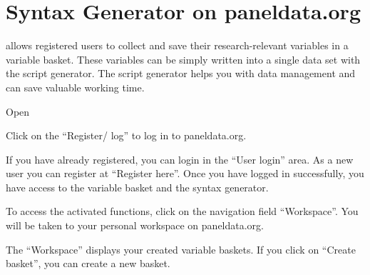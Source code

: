 \documentclass[letterpaper,10pt,openany,onesideH,english]{sphinxmanual}
\begin{document}
\section{Syntax Generator on paneldata.org}
\label{\detokenize{Working with SOEP Documentation/index:syntax-generator-on-paneldata-org}}\label{\detokenize{Working with SOEP Documentation/index:syntax}}
 allows registered users to collect and save their research-relevant variables in a variable basket. These variables can be simply written into a single data set with the script generator. The script generator helps you with data management and can save valuable working time.

Open 

\begin{figure}[H]
\centering

\noindent{}
\end{figure}

Click on the “Register/ log” to log in to paneldata.org.

\begin{figure}[H]
\centering

\noindent{}
\end{figure}

If you have already registered, you can login in the “User login” area. As a new user you can register at “Register here”. Once you have logged in successfully, you have access to the variable basket and the syntax generator.

\begin{figure}[H]
\centering

\noindent{}
\end{figure}

To access the activated functions, click on the navigation field “Workspace”. You will be taken to your personal workspace on paneldata.org.

\begin{figure}[H]
\centering

\noindent{}
\end{figure}

The “Workspace” displays your created variable baskets. If you click on “Create basket”, you can create a new basket.

\begin{figure}[H]
\centering

\noindent{}
\end{figure}
\end{document}
